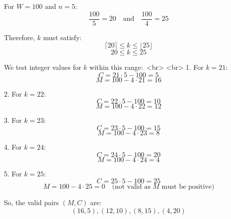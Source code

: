 For \( W = 100 \) and \( n = 5 \):
\[
\frac{100}{5} = 20 \quad \text{and} \quad \frac{100}{4} = 25
\]

Therefore, \(k\) must satisfy:
\[
\lceil 20 \rceil \leq k \leq \lfloor 25 \rfloor
\]
\[
20 \leq k \leq 25
\]

We test integer values for \(k\) within this range\(:\)
<br>
<br>
1. For \( k = 21 \):
\[
C = 21 \cdot 5 - 100 = 5
\]
\[
M = 100 - 4 \cdot 21 = 16
\]

2. For \( k = 22 \):
\[
C = 22 \cdot 5 - 100 = 10
\]
\[
M = 100 - 4 \cdot 22 = 12
\]

3. For \( k = 23 \):
\[
C = 23 \cdot 5 - 100 = 15
\]
\[
M = 100 - 4 \cdot 23 = 8
\]

4. For \( k = 24 \):
\[
C = 24 \cdot 5 - 100 = 20
\]
\[
M = 100 - 4 \cdot 24 = 4
\]

5. For \( k = 25 \):
\[
C = 25 \cdot 5 - 100 = 25
\]
\[
M = 100 - 4 \cdot 25 = 0 \quad \text{(not valid as } M \text{ must be positive)}
\]

So, the valid pairs \( (M, C) \) are:
\[
(16, 5), (12, 10), (8, 15), (4, 20)
\]
